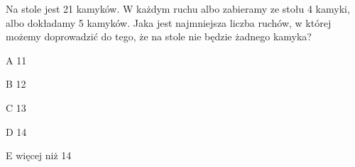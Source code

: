 \begin{tresc}
Na stole jest 21 kamyków. W każdym ruchu albo zabieramy ze stołu 4 kamyki, albo dokładamy 5 kamyków. Jaka jest najmniejsza liczba ruchów, w której możemy doprowadzić do tego, że na stole nie będzie żadnego kamyka?
\end{tresc}
\begin{wariant}{A} 11 \end{wariant}
\begin{wariant}{B} 12 \end{wariant}
\begin{wariant}{C} 13 \end{wariant}
\begin{wariant}{D} 14 \end{wariant}
\begin{wariant}{E} więcej niż 14 \end{wariant}
